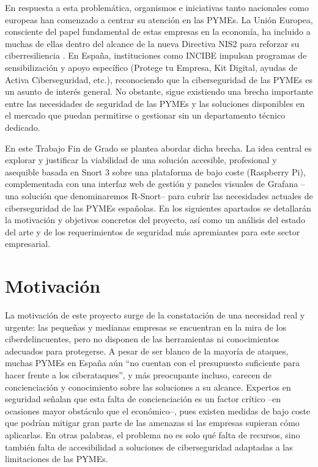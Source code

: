 \documentclass[11pt,a4paper,twoside]{report}
\begin{document}
En respuesta a esta problemática, organismos e iniciativas tanto nacionales como europeas han comenzado a centrar su atención en las PYMEs. La Unión Europea, consciente del papel fundamental de estas empresas en la economía, ha incluido a muchas de ellas dentro del alcance de la nueva Directiva NIS2 para reforzar su ciberresiliencia \cite{incibe2025}. En España, instituciones como INCIBE impulsan programas de sensibilización y apoyo específico (Protege tu Empresa, Kit Digital, ayudas de Activa Ciberseguridad, etc.), reconociendo que la ciberseguridad de las PYMEs es un asunto de interés general. No obstante, sigue existiendo una brecha importante entre las necesidades de seguridad de las PYMEs y las soluciones disponibles en el mercado que puedan permitirse o gestionar sin un departamento técnico dedicado.\newline

En este Trabajo Fin de Grado se plantea abordar dicha brecha. La idea central es explorar y justificar la viabilidad de una solución accesible, profesional y asequible basada en Snort 3 sobre una plataforma de bajo coste (Raspberry Pi), complementada con una interfaz web de gestión y paneles visuales de Grafana –una solución que denominaremos R-Snort– para cubrir las necesidades actuales de ciberseguridad de las PYMEs españolas. En los siguientes apartados se detallarán la motivación y objetivos concretos del proyecto, así como un análisis del estado del arte y de los requerimientos de seguridad más apremiantes para este sector empresarial.

\section{Motivación}

La motivación de este proyecto surge de la constatación de una necesidad real y urgente: las pequeñas y medianas empresas se encuentran en la mira de los ciberdelincuentes, pero no disponen de las herramientas ni conocimientos adecuados para protegerse. A pesar de ser blanco de la mayoría de ataques, muchas PYMEs en España aún “no cuentan con el presupuesto suficiente para hacer frente a los ciberataques”, y más preocupante incluso, carecen de concienciación y conocimiento sobre las soluciones a su alcance. Expertos en seguridad señalan que esta falta de concienciación es un factor crítico –en ocasiones mayor obstáculo que el económico–, pues existen medidas de bajo coste que podrían mitigar gran parte de las amenazas si las empresas supieran cómo aplicarlas. En otras palabras, el problema no es solo qué falta de recursos, sino también falta de accesibilidad a soluciones de ciberseguridad adaptadas a las limitaciones de las PYMEs.\newline
\end{document}
